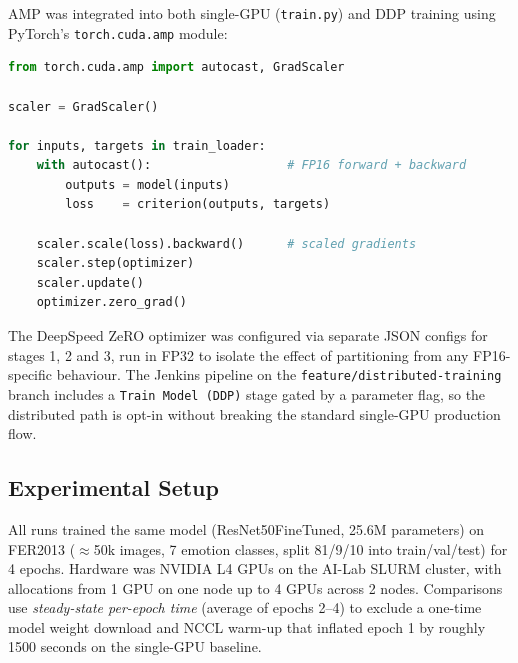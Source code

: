 AMP was integrated into both single-GPU (\texttt{train.py}) and DDP training
using PyTorch's \texttt{torch.cuda.amp} module:

\begin{lstlisting}[language=Python,
  caption={AMP integration with GradScaler},
  label={lst:amp},
  basicstyle=\ttfamily\small,
  keywordstyle=\color{blue},
  commentstyle=\color{gray},
  stringstyle=\color{red!60!black},
  breaklines=true]
from torch.cuda.amp import autocast, GradScaler

scaler = GradScaler()

for inputs, targets in train_loader:
    with autocast():                   # FP16 forward + backward
        outputs = model(inputs)
        loss    = criterion(outputs, targets)

    scaler.scale(loss).backward()      # scaled gradients
    scaler.step(optimizer)
    scaler.update()
    optimizer.zero_grad()
\end{lstlisting}

The DeepSpeed ZeRO optimizer was configured via separate JSON configs for
stages 1, 2 and 3, run in FP32 to isolate the effect of partitioning from
any FP16-specific behaviour. The Jenkins pipeline on the
\texttt{feature/distributed-training} branch includes a
\texttt{Train Model (DDP)} stage gated by a parameter flag, so the
distributed path is opt-in without breaking the standard single-GPU
production flow.

\subsection{Experimental Setup}

All runs trained the same model (ResNet50FineTuned, 25.6M parameters) on
FER2013 ($\approx$50k images, 7 emotion classes, split 81/9/10 into
train/val/test) for 4 epochs. Hardware was NVIDIA L4 GPUs on the AI-Lab
SLURM cluster, with allocations from 1 GPU on one node up to 4 GPUs
across 2 nodes. Comparisons use \emph{steady-state per-epoch time}
(average of epochs 2–4) to exclude a one-time model weight download and
NCCL warm-up that inflated epoch 1 by roughly 1500 seconds on the
single-GPU baseline.

